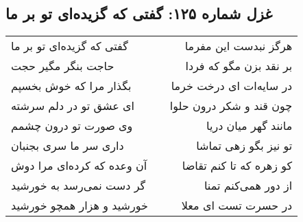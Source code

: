 \begin{center}
\section*{غزل شماره ۱۲۵: گفتی که گزیده‌ای تو بر ما}
\label{sec:0125}
\begin{longtable}{l p{0.5cm} r}
گفتی که گزیده‌ای تو بر ما
&&
هرگز نبدست این مفرما
\\
حاجت بنگر مگیر حجت
&&
بر نقد بزن مگو که فردا
\\
بگذار مرا که خوش بخسپم
&&
در سایه‌ات ای درخت خرما
\\
ای عشق تو در دلم سرشته
&&
چون قند و شکر درون حلوا
\\
وی صورت تو درون چشمم
&&
مانند گهر میان دریا
\\
داری سر ما سری بجنبان
&&
تو نیز بگو زهی تماشا
\\
آن وعده که کرده‌ای مرا دوش
&&
کو زهره که تا کنم تقاضا
\\
گر دست نمی‌رسد به خورشید
&&
از دور همی‌کنم تمنا
\\
خورشید و هزار همچو خورشید
&&
در حسرت تست ای معلا
\\
\end{longtable}
\end{center}
